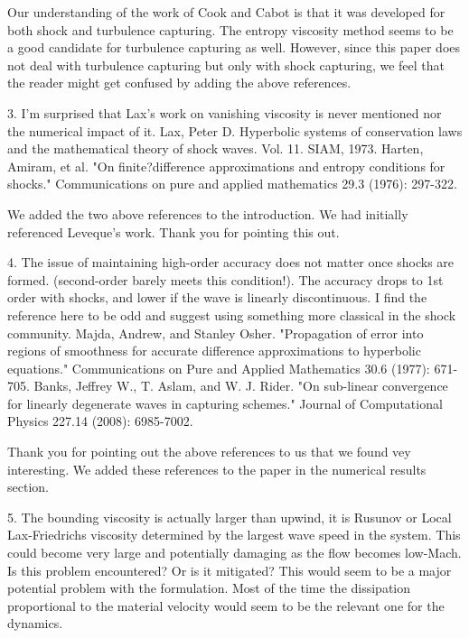 \documentclass{article}
\begin{document}
Our understanding of the work of Cook and Cabot is that it was developed for both shock and turbulence capturing. The entropy viscosity method seems to be a good candidate for turbulence capturing as well. However, since this paper does not deal with turbulence capturing but only with shock capturing, we feel that the reader might get confused by adding the above references.
\bigskip


{
\color{blue}
3. I'm surprised that Lax's work on vanishing viscosity is never mentioned
nor the numerical impact of it.
Lax, Peter D. Hyperbolic systems of conservation laws and the
mathematical theory of shock waves. Vol. 11. SIAM, 1973.
Harten, Amiram, et al. "On finite?difference approximations and entropy
conditions for shocks." Communications on pure and applied mathematics
29.3 (1976): 297-322. 
}

We added the two above references to the introduction. We had initially referenced Leveque's work. Thank you for pointing this out.
\bigskip


{
\color{blue}
4. The issue of maintaining high-order accuracy does not matter once
shocks are formed. (second-order barely meets this condition!). The
accuracy drops to 1st order with shocks, and lower if the wave is linearly
discontinuous. I find the reference here to be odd and suggest using
something more classical in the shock community.
Majda, Andrew, and Stanley Osher. "Propagation of error into regions of
smoothness for accurate difference approximations to hyperbolic
equations." Communications on Pure and Applied Mathematics 30.6
(1977): 671-705.
Banks, Jeffrey W., T. Aslam, and W. J. Rider. "On sub-linear convergence
for linearly degenerate waves in capturing schemes." Journal of
Computational Physics 227.14 (2008): 6985-7002.
}

Thank you for pointing out the above references to us that we found vey interesting. We added these references to the paper in the numerical results section.
\bigskip


{
\color{blue}
5. The bounding viscosity is actually larger than upwind, it is Rusunov or
Local Lax-Friedrichs viscosity determined by the largest wave speed in the
system. This could become very large and potentially damaging as the
flow becomes low-Mach. Is this problem encountered? Or is it mitigated?
This would seem to be a major potential problem with the formulation.
Most of the time the dissipation proportional to the material velocity
would seem to be the relevant one for the dynamics.
}
\end{document}
